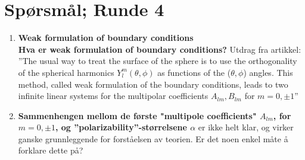 \section{Spørsmål; Runde 4}
\begin{enumerate}[label=\textbf{\arabic*})]
   \item \textbf{Weak formulation of boundary conditions}\\
      \textbf{Hva er weak formulation of boundary conditions?} Utdrag fra artikkel:\\
      ''The usual way to treat the surface of the sphere is to use the orthogonality of the spherical 
      harmonics $Y_l^m(\theta,\phi)$ as functions of the ($\theta,\phi$) angles. This method, called weak
      formulation of the boundary conditions, leads to two infinite linear systems for the multipolar 
      coefficients $A_{lm}, B_{lm}$ for $m = 0, \pm 1$''

   \item \textbf{Sammenhengen mellom de første "multipole coefficients" $A_{lm}$, for $m = 0,\pm 1$,
      og ''polarizability''-størrelsene $\alpha$} er ikke helt klar, og virker ganske grunnleggende 
      for forståelsen av teorien. Er det noen enkel måte å forklare dette på? 


\end{enumerate}
